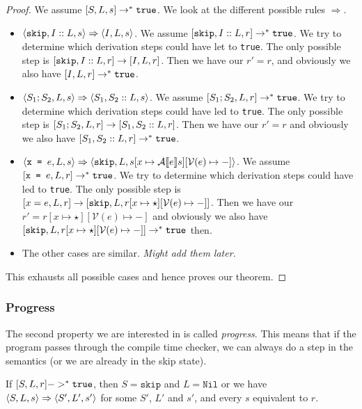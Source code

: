 \begin{proof}
We assume $[ S, L, s ] \to ^* \texttt{true}$. We look at the different possible rules $\Rightarrow$. 
\begin{itemize}
    \item $\langle \texttt{skip}, I::L, s \rangle \Rightarrow \langle I, L, s \rangle$. We assume $[ \texttt{skip}, I::L, r ] \to ^* \texttt{true}$. We try to determine which derivation steps could have let to \texttt{true}. The only possible step is $[ \texttt{skip}, I::L, r ]\to [ I, L, r ]$. Then we have our $r' = r$, and obviously we also have $[ I, L, r ] \to^* \texttt{true}$.
    \item $\langle S_1; S_2, L, s \rangle \Rightarrow \langle S_1, S_2::L, s \rangle$. We assume $[ S_1; S_2, L, r ] \to ^* \texttt{true}$. We try to determine which derivation steps could have led to \texttt{true}. The only possible step is $[ S_1; S_2, L, r ] \to [ S_1, S_2::L, r ]$. Then we have our $r' = r$ and obviously we also have $[ S_1, S_2::L, r ] \to^* \texttt{true}$.
    \item $\langle \texttt{x = } e, L, s \rangle \Rightarrow \langle \texttt{skip}, L, s[x \mapsto \mathcal{A} \llbracket e \rrbracket s][\mathcal{V}(e)\mapsto-] \rangle$. We assume $[ \texttt{x = } e, L, r ] \to ^* \texttt{true}$. We try to determine which derivation steps could have led to \texttt{true}. The only possible step is $[ x=e, L, r ] \to [ \texttt{skip}, L, r[x\mapsto \star][\mathcal{V}(e) \mapsto -] ]$. Then we have our $r' = r[x\mapsto \star][\mathcal{V}(e) \mapsto -]$ and obviously we also have $[ \texttt{skip}, L, r[x\mapsto \star][\mathcal{V}(e) \mapsto -] ] \to^* \texttt{true}$ then.
    \item The other cases are similar. \emph{Might add them later.}
\end{itemize}
This exhausts all possible cases and hence proves our theorem.
\end{proof}

\subsubsection{Progress}
The second property we are interested in is called \emph{progress}. This means that if the program passes through the compile time checker, we can always do a step in the semantics (or we are already in the skip state). 

\begin{theorem}
\label{progress}
If $[ S, L, r ] ->^* \texttt{true}$, then $S = \texttt{skip}$ and $L = \texttt{Nil}$ or we have $\langle S, L, s \rangle \Rightarrow \langle S', L', s' \rangle$ for some $S'$, $L'$ and $s'$, and every $s$ equivalent to $r$.
\end{theorem}

